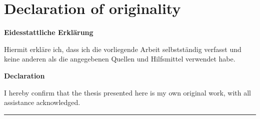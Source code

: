 %
\chapter*{Declaration of originality}
\label{sec:declaration}
\thispagestyle{empty}





\textbf{Eidesstattliche Erklärung}

Hiermit erkläre ich, dass ich die vorliegende Arbeit selbstständig verfasst und keine anderen als die angegebenen Quellen und Hilfsmittel verwendet habe.

\smallskip

\textbf{Declaration}

I hereby confirm that the thesis presented here is my own original work, 
with all assistance acknowledged.

\bigskip

\begin{flushright}

\bigskip

\rule{5cm}{1pt}

\authorName

\noindent{\thesisUniversityCity, \thesisDate}

\end{flushright}






